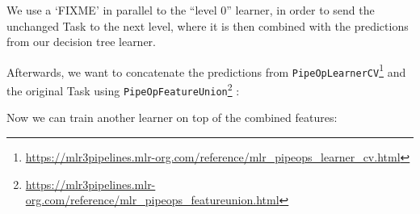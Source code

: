 \documentclass[12pt,]{scrbook}
\newenvironment{Shaded}{}{}
\newcommand{\CommentTok}[1]{\textcolor[rgb]{0.00,0.50,0.00}{#1}}
\newcommand{\DataTypeTok}[1]{#1}
\newcommand{\DecValTok}[1]{#1}
\newcommand{\KeywordTok}[1]{\textcolor[rgb]{0.00,0.00,1.00}{#1}}
\newcommand{\NormalTok}[1]{#1}
\newcommand{\OperatorTok}[1]{#1}
\newcommand{\OtherTok}[1]{\textcolor[rgb]{1.00,0.25,0.00}{#1}}
\newcommand{\StringTok}[1]{\textcolor[rgb]{0.00,0.50,0.50}{#1}}
\renewcommand{\href}[2]{#2\footnote{\url{#1}}}
\begin{document}
We use a `FIXME' in parallel to the ``level 0'' learner, in order to send the unchanged Task to the next level, where it is then combined with the predictions from our decision tree learner.

\begin{Shaded}
\end{Shaded}

Afterwards, we want to concatenate the predictions from \href{https://mlr3pipelines.mlr-org.com/reference/mlr_pipeops_learner_cv.html}{\texttt{PipeOpLearnerCV}} and the original Task using \href{https://mlr3pipelines.mlr-org.com/reference/mlr_pipeops_featureunion.html}{\texttt{PipeOpFeatureUnion}} :

\begin{Shaded}
\end{Shaded}

Now we can train another learner on top of the combined features:

\begin{Shaded}
\end{Shaded}

\begin{Shaded}
\end{Shaded}
\end{document}
